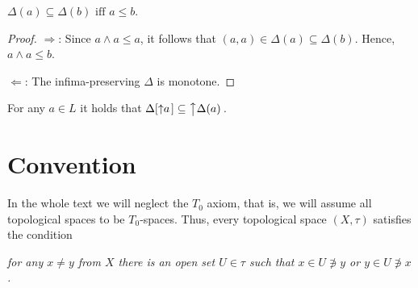 \begin{lem} \label{lem:delta-monotone}
  $\Delta(a) \subseteq \Delta(b) \text{ iff } a \le b$.
\end{lem}
\begin{proof}
  $\Rightarrow$:
  Since $a \wedge a \le a$, it follows that $(a, a)\in \Delta(a) \subseteq
  \Delta(b)$.
  Hence, $a \wedge a \le b$.

  $\Leftarrow$:
  The infima-preserving $\Delta$ is monotone.
\end{proof}

\begin{cor} \label{cor:delta-of-upsets}
  For any $a\in L$ it holds that $\Delta[ \left\uparrow a\right. ] \subseteq
  \left\uparrow \Delta(a)\right.$.
\end{cor}

\section*{Convention}

In the whole text we will neglect the $T_0$ axiom, that is, we will assume all
topological spaces to be $T_0$-spaces.
Thus, every topological space $(X, \tau)$ satisfies the condition
\begin{center} \it
  for any $x \ne y$ from $X$ there is an open set $U \in \tau$ such that $x \in
  U \not\owns y$ or $y \in U \not\owns x$.
\end{center}
